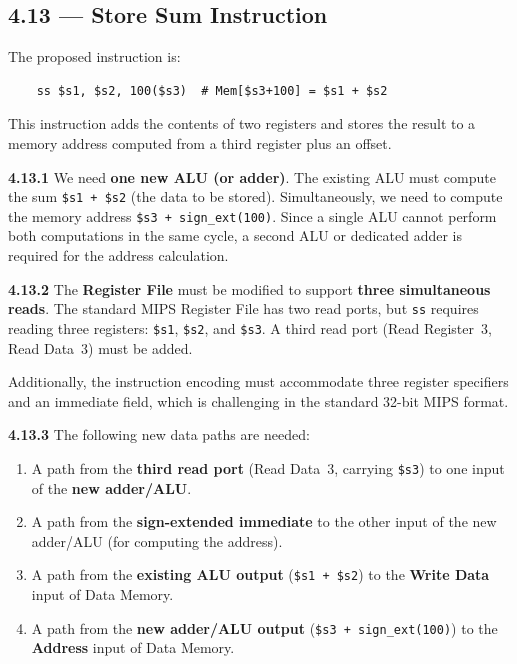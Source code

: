 \subsection*{4.13 --- Store Sum Instruction}
\hypertarget{sol-4.13}{}

The proposed instruction is:
\begin{verbatim}
    ss $s1, $s2, 100($s3)  # Mem[$s3+100] = $s1 + $s2
\end{verbatim}

This instruction adds the contents of two registers and stores the result to a
memory address computed from a third register plus an offset.

\medskip\noindent\textbf{4.13.1}
We need \textbf{one new ALU (or adder)}. The existing ALU must compute the sum
\texttt{\$s1 + \$s2} (the data to be stored). Simultaneously, we need to
compute the memory address \texttt{\$s3 + sign\_ext(100)}. Since a single ALU
cannot perform both computations in the same cycle, a second ALU or dedicated
adder is required for the address calculation.

\medskip\noindent\textbf{4.13.2}
The \textbf{Register File} must be modified to support \textbf{three
simultaneous reads}. The standard MIPS Register File has two read ports, but
\texttt{ss} requires reading three registers: \texttt{\$s1}, \texttt{\$s2},
and \texttt{\$s3}. A third read port (Read Register~3, Read Data~3) must be
added.

Additionally, the instruction encoding must accommodate three register
specifiers and an immediate field, which is challenging in the standard 32-bit
MIPS format.

\medskip\noindent\textbf{4.13.3}
The following new data paths are needed:
\begin{enumerate}
  \item A path from the \textbf{third read port} (Read Data~3, carrying
        \texttt{\$s3}) to one input of the \textbf{new adder/ALU}.
  \item A path from the \textbf{sign-extended immediate} to the other input
        of the new adder/ALU (for computing the address).
  \item A path from the \textbf{existing ALU output} (\texttt{\$s1 + \$s2})
        to the \textbf{Write Data} input of Data Memory.
  \item A path from the \textbf{new adder/ALU output}
        (\texttt{\$s3 + sign\_ext(100)}) to the \textbf{Address} input of
        Data Memory.
\end{enumerate}

